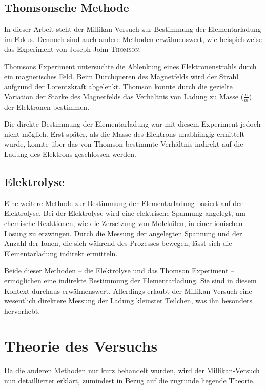 \subsection{Thomsonsche Methode}\label{sub:thomson}
In dieser Arbeit steht der Millikan-Versuch zur Bestimmung der Elementarladung im Fokus. Dennoch sind auch andere Methoden erwähnenswert, wie beispielsweise das Experiment von Joseph John {\scshape Thomson}.

Thomsons Experiment untersuchte die Ablenkung eines Elektronenstrahls durch ein magnetisches Feld. Beim Durchqueren des Magnetfelds wird der Strahl aufgrund der Lorentzkraft abgelenkt. Thomson konnte durch die gezielte Variation der Stärke des Magnetfelds das Verhältnis von Ladung zu Masse ($\frac{e}{m}$) der Elektronen bestimmen.

Die direkte Bestimmung der Elementarladung war mit diesem Experiment jedoch nicht möglich. Erst später, als die Masse des Elektrons unabhängig ermittelt wurde, konnte über das von Thomson bestimmte Verhältnis indirekt auf die Ladung des Elektrons geschlossen werden.

\subsection{Elektrolyse}\label{sub:elektrolyse}
Eine weitere Methode zur Bestimmung der Elementarladung basiert auf der Elektrolyse. Bei der Elektrolyse wird eine elektrische Spannung angelegt, um chemische Reaktionen, wie die Zersetzung von Molekülen, in einer ionischen Lösung zu erzwingen. Durch die Messung der angelegten Spannung und der Anzahl der Ionen, die sich während des Prozesses bewegen, lässt sich die Elementarladung indirekt ermitteln.

Beide dieser Methoden – die Elektrolyse und das Thomson Experiment – ermöglichen eine indirekte Bestimmung der Elementarladung. Sie sind in diesem Kontext durchaus erwähnenswert. Allerdings erlaubt der Millikan-Versuch eine wesentlich direktere Messung der Ladung kleinster Teilchen, was ihn besonders hervorhebt.


\section{Theorie des Versuchs}\label{sec:versuchsTheorie}
Da die anderen Methoden nur kurz behandelt wurden, wird der Millikan-Versuch nun detaillierter erklärt, zumindest in Bezug auf die zugrunde liegende Theorie.\\

